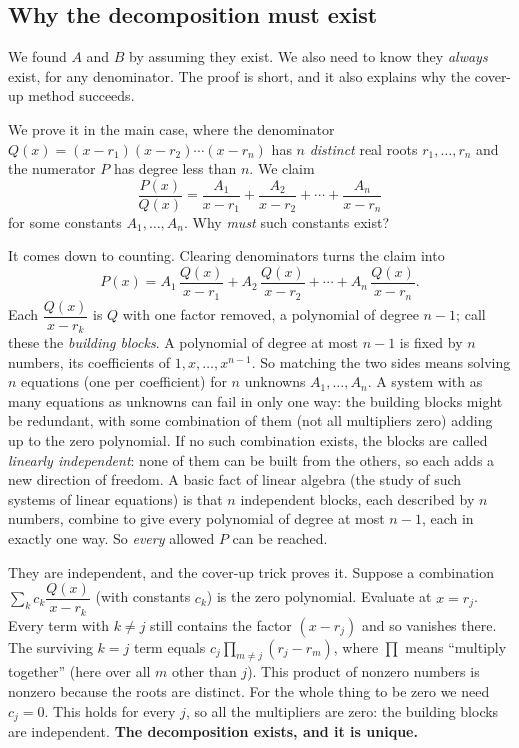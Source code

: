 \subsection{Why the decomposition must exist}
\label{ch24:why-pf-exists}

We found $A$ and $B$ by assuming they exist. We also need to know they
\emph{always} exist, for any denominator. The proof is short, and it also
explains why the cover-up method succeeds.

\begin{whybox}
We prove it in the main case, where the denominator
$Q(x) = (x-r_1)(x-r_2)\cdots(x-r_n)$ has $n$ \emph{distinct} real roots
$r_1, \ldots, r_n$ and the numerator $P$ has degree less than $n$. We claim
\[
\frac{P(x)}{Q(x)} = \frac{A_1}{x-r_1} + \frac{A_2}{x-r_2} + \cdots +
\frac{A_n}{x-r_n}
\]
for some constants $A_1, \ldots, A_n$. Why \emph{must} such constants exist?

It comes down to counting. Clearing denominators turns the claim into
\[
P(x) = A_1\,\frac{Q(x)}{x-r_1} + A_2\,\frac{Q(x)}{x-r_2} + \cdots +
A_n\,\frac{Q(x)}{x-r_n}.
\]
Each $\dfrac{Q(x)}{x-r_k}$ is $Q$ with one factor removed, a polynomial of
degree $n-1$; call these the \emph{building blocks}. A polynomial of degree at
most $n-1$ is fixed by $n$ numbers, its coefficients of $1, x, \ldots,
x^{n-1}$. So matching the two sides means solving $n$ equations (one per
coefficient) for $n$ unknowns $A_1, \ldots, A_n$. A system with as many
equations as unknowns can fail in only one way: the building blocks might be
redundant, with some combination of them (not all multipliers zero) adding up
to the zero polynomial. If no such combination exists, the blocks are called
\emph{linearly independent}: none of them can be built from the others, so each
adds a new direction of freedom. A basic fact of linear algebra (the study of
such systems of linear equations) is that $n$ independent blocks, each described
by $n$ numbers, combine to give every polynomial of degree at most $n-1$, each
in exactly one way. So \emph{every} allowed $P$ can be reached.

They are independent, and the cover-up trick proves it. Suppose a combination
$\sum_k c_k \dfrac{Q(x)}{x-r_k}$ (with constants $c_k$) is the zero polynomial.
Evaluate at $x = r_j$. Every term with $k \neq j$ still contains the factor
$(x - r_j)$ and so vanishes there. The surviving $k=j$ term equals
$c_j \prod_{m\neq j}(r_j - r_m)$, where $\prod$ means ``multiply together'' (here
over all $m$ other than $j$). This product of nonzero numbers is nonzero because
the roots are distinct. For the whole thing to be zero we need $c_j = 0$. This
holds for every $j$, so all the multipliers are zero: the building blocks are
independent. \textbf{The decomposition exists, and it is unique.}
\end{whybox}

